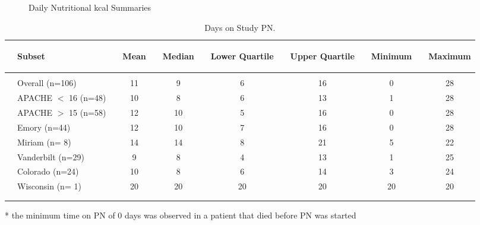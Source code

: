 \documentclass[dvips,10pt]{article}
\begin{document}
\begin{figure}
\caption{Daily Nutritional kcal Summaries }
\end{figure}
\clearpage
\begin{table}[t]
\caption
{ Days on Study PN. }
\begin{center}
\begin{tabular}{ @{}l@{}
@{}l@{}@{}p{1.5em}@{}@{}c@{}@{}p{1.5em}@{}@{}c@{}@{}p{1.5em}@{}@{}c@{}@{}p{1.5em}@{}@{}c@{}@{}p{1.5em}@{}@{}c@{}@{}p{1.5em}@{}@{}c@{}
}
\hline

& \parbox{6em}{\begin{center}Subset\end{center}} && \parbox{6em}{\begin{center}Mean\end{center}} && \parbox{6em}{\begin{center}Median\end{center}} && \parbox{6em}{\begin{center}Lower Quartile\end{center}} && \parbox{6em}{\begin{center}Upper Quartile\end{center}} && \parbox{6em}{\begin{center}Minimum\end{center}} && \parbox{6em}{\begin{center}Maximum\end{center}} \\

\hline

\\
& Overall (n=106) && 11 && 9 && 6 && 16 && 0 && 28 \\
& APACHE  $<$ 16 (n=48) && 10 && 8 && 6 && 13 && 1 && 28 \\
& APACHE $>$ 15 (n=58) && 12 && 10 && 5 && 16 && 0 && 28 \\
& Emory (n=44) && 12 && 10 && 7 && 16 && 0 && 28 \\
& Miriam (n= 8) && 14 && 14 && 8 && 21 && 5 && 22 \\
& Vanderbilt (n=29) && 9 && 8 && 4 && 13 && 1 && 25 \\
& Colorado (n=24) && 10 && 8 && 6 && 14 && 3 && 24 \\
& Wisconsin (n= 1) && 20 && 20 && 20 && 20 && 20 && 20 \\
\\
\hline \\

\end{tabular}


\parbox{ 5in }{ * the minimum time on PN of 0 days was observed in a patient that died before PN was started } \\
 \vspace{1em}\end{center}
 \end{table}
\clearpage
\end{document}

